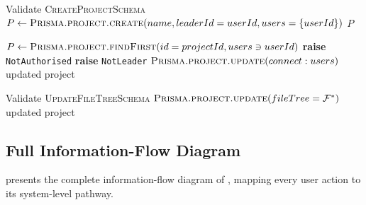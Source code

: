 \begin{algorithm}[H]
\caption{Project Service (\texttt{project.service.ts})}
\label{alg:project_lifecycle}
\begin{algorithmic}[1]
  \State Validate \textsc{CreateProjectSchema}
  \State $P \gets \textsc{Prisma.project.create}(name, leaderId=userId, users=\{userId\})$
  \State \Return $P$
\EndProcedure

  \State $P \gets \textsc{Prisma.project.findFirst}(id=projectId, users \ni userId)$
   \textbf{raise} \texttt{NotAuthorised} \EndIf
   \textbf{raise} \texttt{NotLeader} \EndIf
  \State $\textsc{Prisma.project.update}(connect: users)$ 
  \State \Return updated project
\EndProcedure

  \State Validate \textsc{UpdateFileTreeSchema}
  \State $\textsc{Prisma.project.update}(fileTree = \mathcal{F}^*)$ 
  \State \Return updated project
\EndProcedure
\end{algorithmic}
\end{algorithm}

\subsection{Full Information-Flow Diagram}
\label{sub:flowchart}

 presents the complete information-flow diagram
of \echoray{}, mapping every user action to its system-level pathway.

